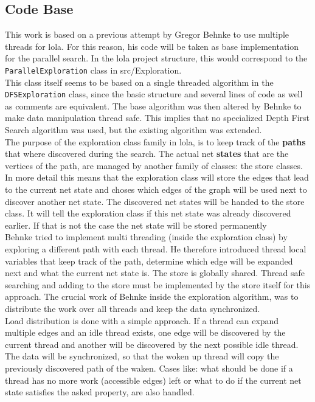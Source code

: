 \subsection{Code Base}
This work is based on a previous attempt by Gregor Behnke to use multiple threads for lola. For this reason, his code will be taken as base implementation for the parallel search. In the lola project structure, this would correspond to the \texttt{ParallelExploration} class in src/Exploration.\\
This class itself seems to be based on a single threaded algorithm in the \texttt{DFSExploration} class, since the basic structure and several lines of code as well as comments are equivalent. The base algorithm was then altered by Behnke to make data manipulation thread safe. This implies that no specialized Depth First Search algorithm was used, but the existing algorithm was extended.\\
The purpose of the exploration class family in lola, is to keep track of the \textbf{paths} that where discovered during the search. The actual net \textbf{states} that are the vertices of the path, are managed by another family of classes: the store classes. In more detail this means that the exploration class will store the edges that lead to the current net state and choses which edges of the graph will be used next to discover another net state. The discovered net states will be handed to the store class. It will tell the exploration class if this net state was already discovered earlier. If that is not the case the net state will be stored permanently\\
Behnke tried to implement multi threading (inside the exploration class) by exploring a different path with each thread. He therefore introduced thread local variables that keep track of the path, determine which edge will be expanded next and what the current net state is. The store is globally shared. Thread safe searching and adding to the store must be implemented by the store itself for this approach. The crucial work of Behnke inside the exploration algorithm, was to distribute the work over all threads and keep the data synchronized.\\
Load distribution is done with a simple approach. If a thread can expand multiple edges and an idle thread exists, one edge will be discovered by the current thread and another will be discovered by the next possible idle thread. The data will be synchronized, so that the woken up thread will copy the previously discovered path of the waken. Cases like: what should be done if a thread has no more work (accessible edges) left or what to do if the current net state satisfies the asked property, are also handled.\\
